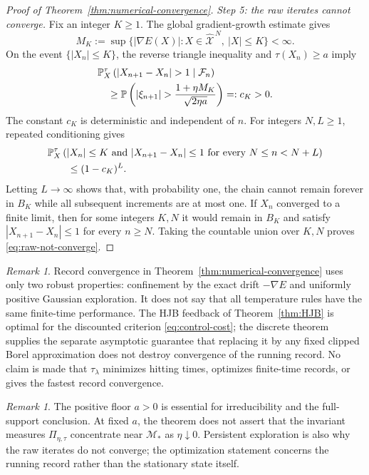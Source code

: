 \documentclass[11pt]{article}
\def\P{\mathbb{P}}
\def\Fc{{\mathcal F}}
\def\Mc{{\mathcal M}}
\def\Xc{{\mathcal X}}
\def\hX{\widehat{\Xc}^{\,N}}
\theoremstyle{definition}
\theoremstyle{remark}
\newtheorem{remark}[theorem]{Remark}
\numberwithin{equation}{section}
\begin{document}
\begin{proof}[Proof of Theorem~\ref{thm:numerical-convergence}]
\smallskip
\noindent\textit{Step 5: the raw iterates cannot converge.}
Fix an integer $K\ge1$.  The global gradient-growth estimate gives
\[
 M_K:=\sup\{|\nabla E(X)|:X\in\hX,\ |X|\le K\}<\infty.
\]
On the event $\{|X_n|\le K\}$, the reverse triangle inequality and $\tau(X_n)\ge a$ imply
\begin{align}
 &\P_X^\tau\left(|X_{n+1}-X_n|>1\mid\Fc_n\right)\notag\\
 &\quad\ge
 \P\left(
 |\xi_{n+1}|>\frac{1+\eta M_K}{\sqrt{2\eta a}}
 \right)
 =:c_K>0.
 \label{eq:uniform-large-increment-chain}
\end{align}
The constant $c_K$ is deterministic and independent of $n$.  For integers $N,L\ge1$, repeated
conditioning gives
\begin{align}
 &\P_X^\tau\left(
 |X_n|\le K\text{ and }|X_{n+1}-X_n|\le1
 \text{ for every }N\le n<N+L
 \right)\notag\\
 &\qquad\le(1-c_K)^L.
 \label{eq:block-small-increments-chain}
\end{align}
Letting $L\to\infty$ shows that, with probability one, the chain cannot remain forever in $B_K$
while all subsequent increments are at most one.  If $X_n$ converged to a finite limit, then for
some integers $K,N$ it would remain in $B_K$ and satisfy
$|X_{n+1}-X_n|\le1$ for every $n\ge N$.  Taking the countable union over $K,N$ proves
\eqref{eq:raw-not-converge}.
\end{proof}

\begin{remark}\label{rem:role-feedback}
Record convergence in Theorem~\ref{thm:numerical-convergence} uses only two robust properties:
confinement by the exact drift $-\nabla E$ and uniformly positive Gaussian exploration.  It does not
say that all temperature rules have the same finite-time performance.  The HJB feedback of
Theorem~\ref{thm:HJB} is optimal for the discounted criterion \eqref{eq:control-cost}; the discrete
theorem supplies the separate asymptotic guarantee that replacing it by any fixed clipped Borel
approximation does not destroy convergence of the running record.  No claim is made that
$\tau_\lambda$ minimizes hitting times, optimizes finite-time records, or gives the fastest record
convergence.
\end{remark}

\begin{remark}\label{rem:positive-floor-invariant-law}
The positive floor $a>0$ is essential for irreducibility and the full-support conclusion.  At fixed
$a$, the theorem does not assert that the invariant measures $\Pi_{\eta,\tau}$ concentrate near
$\Mc_*$ as $\eta\downarrow0$.  Persistent exploration is also why the raw iterates do not converge;
the optimization statement concerns the running record rather than the stationary state itself.
\end{remark}
\end{document}
